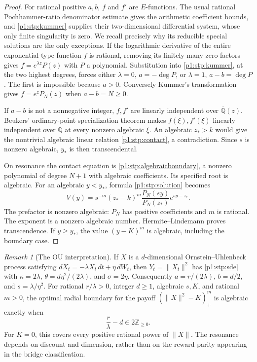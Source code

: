 \documentclass[11pt,a4paper]{article}
\theoremstyle{definition}
\theoremstyle{remark}
\newtheorem{remark}[theorem]{Remark}
\numberwithin{equation}{section}
\begin{document}
\begin{proof}
For rational positive $a,b$, $f$ and $f'$ are $E$-functions.
The usual rational Pochhammer-ratio denominator estimate gives the
arithmetic coefficient bounds, and \eqref{p1:stp:kummer} supplies their
two-dimensional differential system, whose only finite singularity
is zero.  We recall precisely why its reducible special solutions
are the only exceptions.  If the logarithmic derivative of the
entire exponential-type function $f$ is rational, removing its
finitely many zero factors gives
$f=e^{\lambda z}P(z)$ with $P$ a polynomial.  Substitution into
\eqref{p1:stp:kummer}, at the two highest degrees, forces either
$\lambda=0$, $a=-\deg P$, or $\lambda=1$, $a-b=\deg P$.
The first is impossible because $a>0$.  Conversely Kummer's
transformation gives $f=e^zP_N(z)$ when $a-b=N\ge0$.

If $a-b$ is not a nonnegative integer, $f,f'$ are linearly
independent over $\overline{\mathbb Q}(z)$.  Beukers' ordinary-point
specialization theorem \cite[Corollary~1.4]{p8:AC_Beukers2006} makes
$f(\xi),f'(\xi)$ linearly independent over
$\overline{\mathbb Q}$ at every nonzero algebraic $\xi$.
An algebraic $z_*>k$ would give the nontrivial algebraic linear
relation \eqref{p1:stp:contact}, a contradiction.  Since $s$ is
nonzero algebraic, $y_*$ is then transcendental.

On resonance the contact equation is
\eqref{p1:stp:algebraicboundary}, a nonzero polynomial of degree
$N+1$ with algebraic coefficients.  Its specified root is
algebraic.  For an algebraic $y<y_*$, formula
\eqref{p1:stp:solution} becomes
\[
 V(y)=s^{-m}(z_*-k)^m\frac{P_N(sy)}{P_N(z_*)}
             e^{sy-z_*}.
\]
The prefactor is nonzero algebraic: $P_N$ has positive coefficients
and $m$ is rational.  The exponent is a nonzero algebraic number.
Hermite--Lindemann proves transcendence.  If $y\ge y_*$, the
value $(y-K)^m$ is algebraic, including the boundary case.
\end{proof}

\begin{remark}[The OU interpretation]
If $X$ is a $d$-dimensional Ornstein--Uhlenbeck process satisfying
$dX_t=-\lambda X_t\,dt+\eta\,dW_t$, then $Y_t=\|X_t\|^2$
has \eqref{p1:stp:sde} with
$\kappa=2\lambda$, $\theta=d\eta^2/(2\lambda)$, and
$\sigma=2\eta$.  Consequently $a=r/(2\lambda)$,
$b=d/2$, and $s=\lambda/\eta^2$.
For rational $r/\lambda>0$, integer $d\ge1$, algebraic $s,K$,
and rational $m>0$, the optimal radial boundary for the payoff
$(\|X\|^2-K)_+^m$ is algebraic exactly when
\[
                    \frac r\lambda-d\in2\mathbb Z_{\ge0}.
\]
For $K=0$, this covers every positive rational power of $\|X\|$.
The resonance depends on discount and dimension, rather than on
the reward parity appearing in the bridge classification.
\end{remark}
\end{document}
